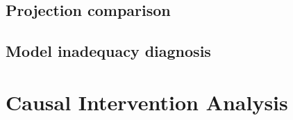 \documentclass[11pt]{article}
\begin{document}
\subsection{Projection comparison}
%
%
%

\subsection{Model inadequacy diagnosis}
%
%


\section{Causal Intervention Analysis}
\label{sec:interventions}

%
%
%
%
\end{document}
